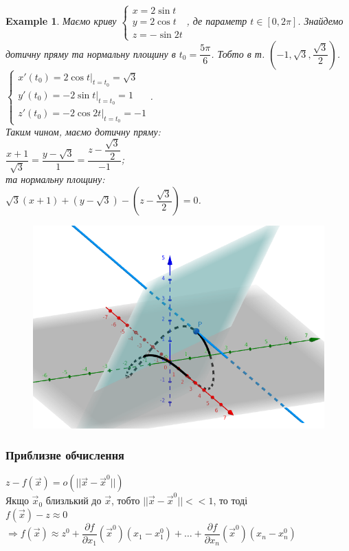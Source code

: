 \documentclass[a4paper, 10pt]{article}
\def\departial#1#2{\dfrac{\partial {#1}}{\partial {#2}}}
\def\bigline{\vspace{5mm}\\}
\theoremstyle{theoremdd}
\theoremstyle{theoremdd}
\theoremstyle{theoremdd}
\theoremstyle{theoremdd}
\newtheorem{example}[theorem]{Example}
\theoremstyle{theoremdd}
\theoremstyle{theoremdd}
\theoremstyle{theoremdd}
\theoremstyle{theoremdd}
\begin{document}
\begin{example}
Маємо криву $\begin{cases} x = 2 \sin t \\ y = 2 \cos t \\ z = -\sin 2t \end{cases}$, де параметр $t \in [0,2\pi]$. Знайдемо дотичну пряму та нормальну площину в $t_0 = \dfrac{5 \pi}{6}$. Тобто в т. $\left(-1,\sqrt{3}, \dfrac{\sqrt{3}}{2} \right)$.\\
$\begin{cases}
x'(t_0) = 2 \cos t \Big|_{t = t_0} = \sqrt{3} \\
y'(t_0) = -2 \sin t \Big|_{t = t_0} = 1 \\
z'(t_0) = -2 \cos 2t \Big|_{t = t_0} = -1
\end{cases}$.\\
Таким чином, маємо дотичну пряму:\\
$\dfrac{x+1}{\sqrt{3}} = \dfrac{y-\sqrt{3}}{1} = \dfrac{z-\dfrac{\sqrt{3}}{2}}{-1}$;\\
та нормальну площину:\\
$\sqrt{3}(x+1) + (y-\sqrt{3}) - \left( z - \dfrac{\sqrt{3}}{2} \right) = 0$.
\begin{figure}[H]
\centering
\includegraphics[scale=0.4]{tangent_line.png}
\end{figure}
\end{example}

\subsubsection{Приблизне обчислення}
$z-f(\vec{x}) = o(||\vec{x}-\vec{x}^0||)$\\
Якщо $\vec{x}_0$ близлький до $\vec{x}$, тобто $||\vec{x} - \vec{x}^0|| << 1$, то тоді\\
$f(\vec{x})-z \approx 0$\\
$\Rightarrow f(\vec{x}) \approx z^0 + \departial{f}{x_1}(\vec{x}^0)(x_1-x_1^0) + \dots + \departial{f}{x_n}(\vec{x}^0)(x_n-x_n^0)$
\bigline
\end{document}
